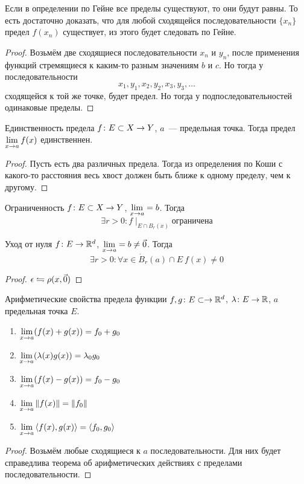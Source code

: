 \begin{Rem}
Если в определении по Гейне все пределы существуют, то они будут равны. То есть достаточно доказать,
что для любой сходящейся последовательности $\{x_n\}$ предел $f(x_n)$ существует, из этого
будет следовать по Гейне.
\end{Rem}
\begin{proof}
Возьмём две сходящиеся последовательности $x_n$ и $y_n$, после применения функций стремящиеся к каким-то разным значениям $b$ и $c$. Но тогда
у последовательности 
$$x_1, y_1, x_2, y_2, x_3, y_3, \ldots$$
сходящейся к той же точке, будет предел. Но тогда у подпоследовательностей одинаковые пределы.
\end{proof}

\begin{assertion}{Единственность предела}
$f\colon E \subset X \rightarrow Y$, $a$~--- предельная точка. Тогда предел $\lim\limits_{x\rightarrow a} f(x)$ единственнен.
\end{assertion}
\begin{proof}
Пусть есть два различных предела. Тогда из определения по Коши с какого-то расстояния весь хвост должен быть ближе к одному пределу, чем к другому.
\end{proof}

\begin{theorem}{Ограниченность}
$f\colon E \subset X \rightarrow Y$, $\lim\limits_{x\rightarrow a} = b$. Тогда 
$$\exists r>0\colon f \mid_{E \cap B_r(x)}\text{ограничена}$$
\end{theorem}

\begin{theorem}{Уход от нуля}
$f\colon E \rightarrow \mathbb{R}^d$, $\lim\limits_{x\rightarrow a} = b \ne \vec 0$. Тогда
$$\exists r>0\colon \forall x \in \dot B_r(a) \cap E\: f(x) \ne 0$$
\end{theorem}
\begin{proof}
$\epsilon \leftrightharpoons \rho(x, \vec 0)$
\end{proof}

\begin{theorem}{Арифметические свойства предела функции}
$f, g\colon E \subset \rightarrow \mathbb{R}^d$, $\lambda\colon E \rightarrow \mathbb{R}$, $a$ предельная точка $E$.
\begin{enumerate}
\item $\lim\limits_{x\rightarrow a} (f(x) + g(x)) = f_0 + g_0$
\item $\lim\limits_{x\rightarrow a} (\lambda(x)  g(x)) = \lambda_0 g_0$
\item $\lim\limits_{x\rightarrow a} (f(x) - g(x)) = f_0 - g_0$
\item $\lim\limits_{x\rightarrow a} \left\|f(x)\right\| = \left\|f_0\right\|$
\item $\lim\limits_{x\rightarrow a} \left<f(x), g(x)\right> = \left<f_0, g_0\right>$
\end{enumerate}
\end{theorem}
\begin{proof}
Возьмём любые сходящиеся к $a$ последовательности. Для них будет справедлива теорема об арифметических действиях с пределами последовательности.
\end{proof}

